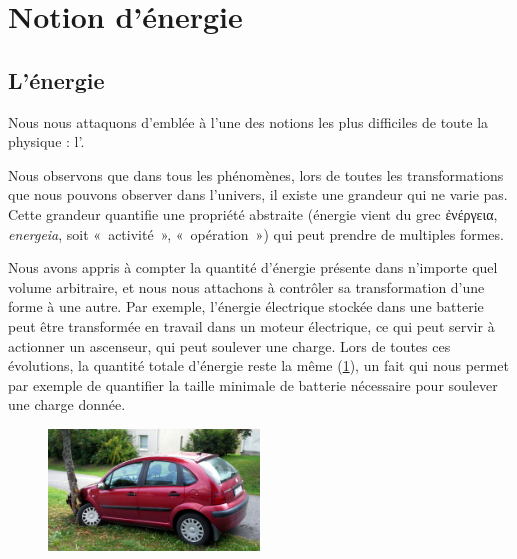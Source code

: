 \section{Notion d’énergie}

	\subsection{L’énergie}
	\label{ch_energie}
	
		Nous nous attaquons d’emblée à l’une des notions les plus difficiles de toute la physique : l’.
		
		Nous observons que dans tous les phénomènes, lors de toutes les transformations que nous pouvons observer dans l’univers, il existe une grandeur qui ne varie pas. Cette grandeur quantifie une propriété abstraite (énergie vient du grec \textgreek{ἐνέργεια}, \textit{energeia}, soit «~activité~», «~opération~») qui peut prendre de multiples formes.
		
		Nous avons appris à compter la quantité d’énergie présente dans n’importe quel volume arbitraire, et nous nous attachons à contrôler sa transformation d’une forme à une autre. Par exemple, l’énergie électrique stockée dans une batterie peut être transformée en travail dans un moteur électrique, ce qui peut servir à actionner un ascenseur, qui peut soulever une charge. Lors de toutes ces évolutions, la quantité totale d’énergie reste la même (\cref{fig_crashed_car}), un fait qui nous permet par exemple de quantifier la taille minimale de batterie nécessaire pour soulever une charge donnée.
		
		\begin{figure}
			\begin{center}
				\includegraphics[width=0.5\textwidth]{images/crashed_citroen_c3.jpg}
			\end{center}
			\label{fig_crashed_car}
		\end{figure}
		
